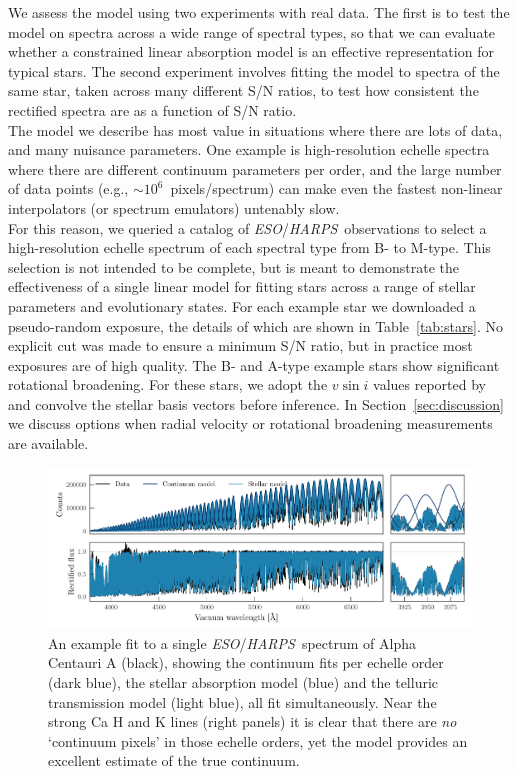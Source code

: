 \documentclass[modern]{aastex631}
\newcommand{\project}[1]{\textit{#1}}
\newcommand{\eso}{\project{ESO}}
\newcommand{\harps}{\project{HARPS}}
\newcommand{\todo}[1]{\textcolor{tab:red}{#1}}
\begin{document}
We assess the model using two experiments with real data. The first is to test the model on spectra across a wide range of spectral types, so that we can evaluate whether a constrained linear absorption model is an effective representation for typical stars. The second experiment involves fitting the model to spectra of the same star, taken across many different S/N ratios, to test how consistent the rectified spectra are as a function of S/N ratio.\\

The model we describe has most value in situations where there are lots of data, and many nuisance parameters. One example is high-resolution echelle spectra where there are different continuum parameters per order, and the large number of data points (e.g., $\sim10^6$~pixels/spectrum) can make even the fastest non-linear interpolators (or spectrum emulators) untenably slow.\\

For this reason, we queried a catalog of \eso/\harps\ observations to select a high-resolution echelle spectrum of each spectral type from B- to M-type. This selection is not intended to be complete, but is meant to demonstrate the effectiveness of a single linear model for fitting stars across a range of stellar parameters and evolutionary states. For each example star we downloaded a pseudo-random exposure, the details of which are shown in Table~\ref{tab:stars}. No explicit cut was made to ensure a minimum S/N ratio, but in practice most exposures are of high quality. The B- and A-type example stars show significant rotational broadening. For these stars, we adopt the $v\sin{i}$ values reported by \citet{Someone} and convolve the stellar basis vectors before inference. In Section~\ref{sec:discussion} we discuss options when radial velocity or rotational broadening measurements are available.\\



\begin{figure}
    \includegraphics[width=\textwidth]{harps-alfCenA-example.pdf}
    \caption{An example fit to a single \eso/\harps\ spectrum of Alpha Centauri A (black), showing the continuum fits per echelle order (dark blue), the stellar absorption model (blue) and the \todo{telluric transmission model (light blue)}, all fit simultaneously. Near the strong Ca H and K lines (right panels) it is clear that there are \emph{no} `continuum pixels' in those echelle orders, yet the model provides an excellent estimate of the true continuum. \label{fig:alf-cen-A-example}}
\end{figure}
\end{document}
